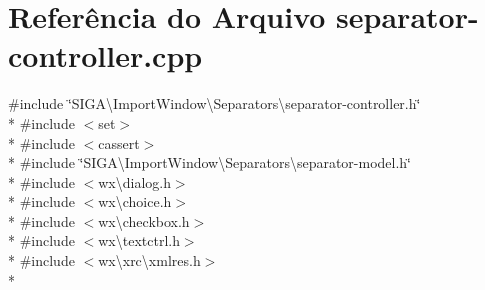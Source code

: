 \section{Referência do Arquivo separator-\/controller.cpp}
\label{separator-controller_8cpp}
{\ttfamily \#include \char`\"{}S\+I\+G\+A\textbackslash{}\+Import\+Window\textbackslash{}\+Separators\textbackslash{}separator-\/controller.\+h\char`\"{}}\\*
{\ttfamily \#include $<$set$>$}\\*
{\ttfamily \#include $<$cassert$>$}\\*
{\ttfamily \#include \char`\"{}S\+I\+G\+A\textbackslash{}\+Import\+Window\textbackslash{}\+Separators\textbackslash{}separator-\/model.\+h\char`\"{}}\\*
{\ttfamily \#include $<$wx\textbackslash{}dialog.\+h$>$}\\*
{\ttfamily \#include $<$wx\textbackslash{}choice.\+h$>$}\\*
{\ttfamily \#include $<$wx\textbackslash{}checkbox.\+h$>$}\\*
{\ttfamily \#include $<$wx\textbackslash{}textctrl.\+h$>$}\\*
{\ttfamily \#include $<$wx\textbackslash{}xrc\textbackslash{}xmlres.\+h$>$}\\*
